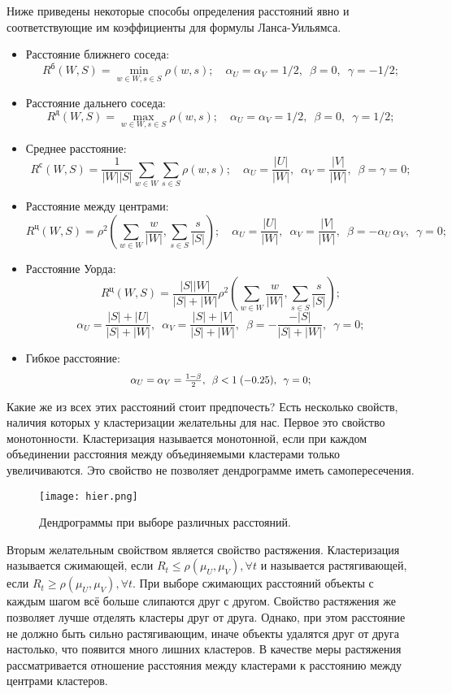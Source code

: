 \documentclass[10pt]{article}
\renewcommand{\leq}{\leqslant}
\renewcommand{\geq}{\geqslant}
\begin{document}
Ниже приведены некоторые способы определения расстояний явно и соответствующие им коэффициенты для формулы Ланса-Уильямса. 
\begin{itemize}
	\item Расстояние ближнего соседа:
		$$R^{\text{б}}(W, S) = \min_{w \in W, s \in S} \rho(w, s); \quad \alpha_U=\alpha_V=1/2,\enspace \beta=0,\enspace \gamma=-1/2;$$
	\item Расстояние дальнего соседа:
		$$R^{\text{д}}(W, S) = \max_{w \in W, s \in S} \rho(w, s); \quad \alpha_U=\alpha_V=1/2,\enspace \beta=0,\enspace \gamma=1/2;$$
	\item Среднее расстояние:
		$$R^{\text{с}}(W, S) = \frac{1}{ |W| |S| } \sum_{w \in W} \sum_{s \in S} \rho(w, s); \quad \alpha_U=\frac{|U|}{|W|},\enspace \alpha_V=\frac{|V|}{|W|},\enspace \beta=\gamma=0;$$
		
	\item Расстояние между центрами:
		$$R^{\text{ц}}(W, S) = \rho^2 \left( \sum_{w \in W} \frac{w}{|W|}, \sum_{s \in S} \frac{s}{|S|}\right); \quad
		\alpha_U=\frac{|U|}{|W|},\enspace \alpha_V=\frac{|V|}{|W|},\enspace \beta= -\alpha_U \,\alpha_V,\enspace \gamma=0;$$
	\item Расстояние Уорда:
		$$R^{\text{ц}}(W, S) = \frac{|S| |W|}{|S| + |W|} \rho^2 \left( \sum_{w \in W} \frac{w}{|W|}, \sum_{s \in S} \frac{s}{|S|}\right);$$  
		$$\alpha_U=\frac{|S|+|U|}{|S|+|W|},\enspace \alpha_V=\frac{|S|+|V|}{|S|+|W|},\enspace \beta= -\frac{-|S|}{|S|+|W|},\enspace \gamma=0;$$

	\item Гибкое расстояние: $$\scalebox{0.9}{$\alpha_U=\alpha_V=\frac{1-\beta}{2},\enspace \beta<1 \;(-0.25),\enspace \gamma=0$};$$
	\end{itemize}

Какие же из всех этих расстояний стоит предпочесть? Есть несколько свойств, наличия которых у кластеризации желательны для нас.
Первое это свойство монотонности. Кластеризация называется монотонной, если при каждом объединении расстояния между объединяемыми кластерами только увеличиваются.
Это свойство не позволяет дендрограмме иметь самопересечения.
\begin{figure}
	\centering
	\texttt{[image: hier.png]}
	\caption{Дендрограммы при выборе различных расстояний.}
\end{figure}

Вторым желательным свойством является свойство растяжения. Кластеризация называется сжимающей, если $R_t \leq \rho(\mu_U, \mu_V), \forall t$ и называется растягивающей, 
если $R_t \geq \rho(\mu_U, \mu_V), \forall t$.
При выборе сжимающих расстояний объекты с каждым шагом всё больше слипаются друг с другом.
Свойство растяжения же позволяет лучше отделять кластеры друг от друга. 
Однако, при этом расстояние не должно быть сильно растягивающим, иначе объекты удалятся друг от друга настолько, что появится много лишних кластеров. 
В качестве меры растяжения рассматривается отношение расстояния между кластерами к расстоянию между центрами кластеров. 
\end{document}
